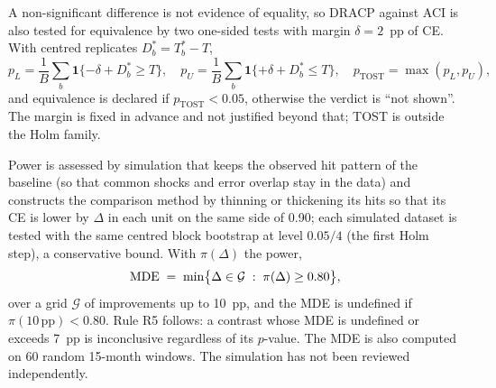 A non-significant difference is not evidence of equality, so DRACP against ACI is also tested for equivalence by two one-sided tests \citep[TOST;][]{schuirmann1987tost} with margin $\delta=2$~pp of CE. With centred replicates $D^{*}_b=T^{*}_b-T$,
\begin{equation}\label{eq:tost}
p_L=\frac1B\sum_{b}\mathbf 1\{-\delta+D^{*}_b\ge T\},\quad
p_U=\frac1B\sum_{b}\mathbf 1\{+\delta+D^{*}_b\le T\},\quad
p_{\mathrm{TOST}}=\max(p_L,p_U),
\end{equation}
and equivalence is declared if $p_{\mathrm{TOST}}<0.05$, otherwise the verdict is ``not shown''. The margin is fixed in advance and not justified beyond that; TOST is outside the Holm family.

Power is assessed by simulation that keeps the observed hit pattern of the baseline (so that common shocks and error overlap stay in the data) and constructs the comparison method by thinning or thickening its hits so that its CE is lower by $\Delta$ in each unit on the same side of 0.90; each simulated dataset is tested with the same centred block bootstrap at level $0.05/4$ (the first Holm step), a conservative bound. With $\pi(\Delta)$ the power,
\begin{equation}\label{eq:mde}
\mathrm{MDE} \;=\; \min\bigl\{\Delta\in\mathcal G \;:\; \pi(\Delta)\ge 0.80\bigr\},
\end{equation}
over a grid $\mathcal G$ of improvements up to 10~pp, and the MDE is undefined if $\pi(10\,\mathrm{pp})<0.80$. Rule R5 follows: a contrast whose MDE is undefined or exceeds 7~pp is inconclusive regardless of its $p$-value. The MDE is also computed on 60 random 15-month windows. The simulation has not been reviewed independently.

